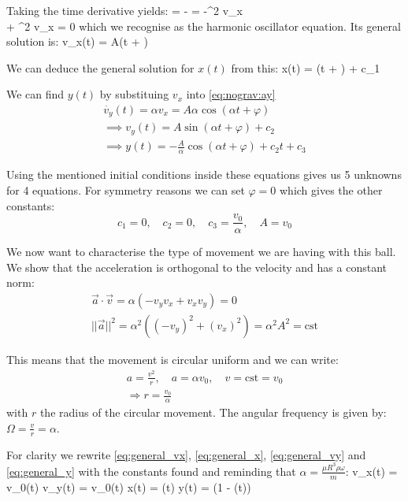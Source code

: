 Taking the time derivative yields:
\be
     = -\alpha {} = -\alpha ^2 v_x \\
    \implies {} + \alpha^2 v_x = 0
\ee
which we recognise as the harmonic oscillator equation. Its general solution is:
\be
    v_x(t) = A\cos(\alpha t + \varphi)
    \label{eq:general_vx}
\ee

We can deduce the general solution for \(x(t)\) from this:
\be
    x(t) = \sin(\alpha t + \varphi) + c_1
    \label{eq:general_x}
\ee

We can find \(y(t)\) by substituing \(v_x\) into \autoref{eq:nograv:ay}
\begin{eqnarray}
    \dot{v_y}(t) = \alpha v_x = A\alpha\cos(\alpha t + \varphi) \\
    \implies v_y(t) = A \sin(\alpha t + \varphi) + c_2
    \label{eq:general_vy} \\
    \implies y(t) = -\frac{A}{\alpha}\cos(\alpha t + \varphi) + c_2 t+ c_3
    \label{eq:general_y}
\end{eqnarray}

Using the mentioned initial conditions inside these equations gives us 5 unknowns for 4 equations. For symmetry reasons we can set $\varphi = 0$ which gives the other constants:
\[ c_1 = 0, \quad c_2 = 0, \quad c_3 = \frac{v_0}{\alpha}, \quad A = v_0\]

We now want to characterise the type of movement we are having with this ball. We show that the acceleration is orthogonal to the velocity and has a constant norm:
\begin{gather}
    \vec{a} \cdot \vec{v} = \alpha(-v_y v_x + v_x v_y) = 0 \\
    ||\vec{a}||^2 = \alpha^2 ((-v_y)^2 + (v_x)^2) = \alpha^2 A^2 = \mathrm{cst}
\end{gather}

This means that the movement is circular uniform and we can write:
\begin{gather*} 
    a = \frac{v^2}{r} , \quad a = \alpha v_0, \quad v = \mathrm{cst} = v_0 \\
    \Rightarrow r = \frac{v_0}{\alpha}
\end{gather*}
with $r$ the radius of the circular movement. The angular frequency is given by: $\Omega = \frac{v}{r} = \alpha$.

For clarity we rewrite \autoref{eq:general_vx}, \autoref{eq:general_x}, \autoref{eq:general_vy} and \autoref{eq:general_y} with the constants found and reminding that $\alpha = \frac{\mu R^3 \rho \omega}{m}$:
\be
    v_x(t) = v_0\cos(\alpha t)
    \label{eq:vx_g0}
\ee
\be
    v_y(t) = v_0\sin(\alpha t)
    \label{eq:vy_g0}
\ee
\be
    x(t) = \sin(\alpha t)
    \label{eq:x_g0}
\ee
\be
    y(t) = (1 - \cos(\alpha t))
    \label{eq:y_g0}
\ee



